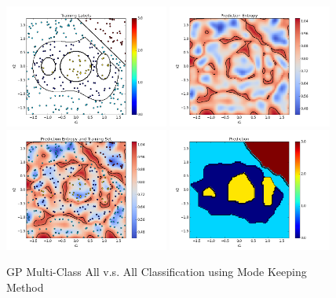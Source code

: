 				\begin{figure}[!htbp]
					\centering
						\includegraphics[width=0.48\textwidth]{Figures/Progress/modekeepingAVA/Figure1.png}
						\includegraphics[width=0.48\textwidth]{Figures/Progress/modekeepingAVA/Figure2.png}
						\includegraphics[width=0.48\textwidth]{Figures/Progress/modekeepingAVA/Figure3.png}
						\includegraphics[width=0.48\textwidth]{Figures/Progress/modekeepingAVA/Figure4.png}
					\caption{GP Multi-Class All v.s. All Classification using Mode Keeping Method}
					\label{ProgressReport:GaussianProcessModels:Figure:modekeepingAVA1}
				\end{figure}

